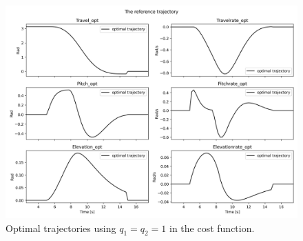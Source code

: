 \documentclass[../main.tex]{subfiles}
\begin{document}
\begin{figure}[h]
	\centering
	\includegraphics[width=\linewidth]{figures/LAB4_reference_trajectory.png}
	\caption{Optimal trajectories using  $q_1 = q_2 = 1$ in the cost function.}
	\label{fig:lab4_opt_trajectory}
\end{figure}
\end{document}
